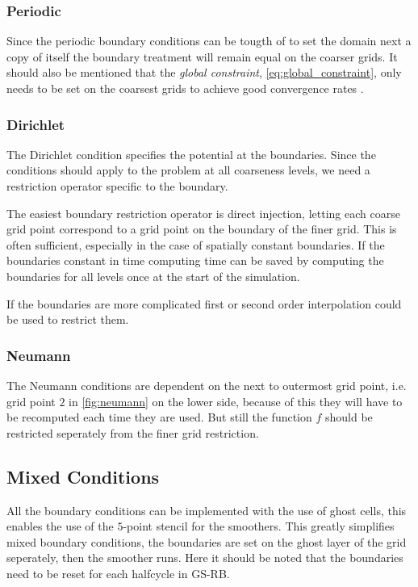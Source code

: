 	\subsubsection{Periodic}
		Since the periodic boundary conditions can be tougth of to set the domain next
		a copy of itself the boundary treatment will remain equal on the coarser
		grids. It should also be mentioned that the \textit{global constraint}, \cref{eq:global_constraint},
		only needs to be set on the coarsest grids to achieve good convergence
		rates \citep{trottenberg_multigrid_2000}.

	\subsubsection{Dirichlet}
		The Dirichlet condition specifies the potential at the boundaries. Since the conditions
		should apply to the problem at all coarseness levels, we need a restriction
		operator specific to the boundary.

		The easiest boundary restriction operator is direct injection, letting each
		coarse grid point correspond to a grid point on the boundary of the finer grid.
		This is often sufficient, especially in the case of spatially constant boundaries.
		If the boundaries constant in time computing time can be saved by computing the boundaries for all levels
		once at the start of the simulation.

		If the boundaries are more complicated first or second order interpolation
		could be used to restrict them.

	\subsubsection{Neumann}
		The Neumann conditions are dependent on the next to outermost grid point,
		i.e. grid point \(2\) in \cref{fig:neumann} on the lower side,
		because of this they will have to be recomputed each time they are used.
		But still the function \(f\) should be restricted seperately from the
		finer grid restriction.


	\subsection{Mixed Conditions}
		All the boundary conditions can be implemented with the use of ghost cells,
		this enables the use of the \(5\)-point stencil for the smoothers. This
		greatly simplifies mixed boundary conditions, the boundaries are set on the
		ghost layer of the grid seperately, then the smoother runs. Here it should
		be noted that the boundaries need to be reset for each halfcycle in GS-RB.

